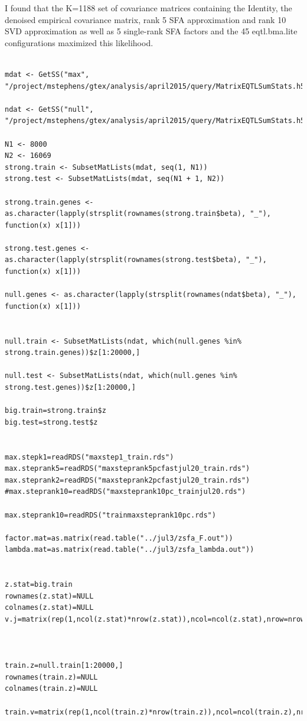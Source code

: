 \documentclass[10pt]{article}
\begin{document}
\begin{itemize}
I found that the K=1188 set of covariance matrices containing the Identity, the denoised empirical covariance matrix, rank 5 SFA approximation and rank 10 SVD approximation as well as 5 single-rank SFA factors and the 45 eqtl.bma.lite configurations maximized this likelihood.


\begin{verbatim}

mdat <- GetSS("max", "/project/mstephens/gtex/analysis/april2015/query/MatrixEQTLSumStats.h5")

ndat <- GetSS("null", "/project/mstephens/gtex/analysis/april2015/query/MatrixEQTLSumStats.h5")

N1 <- 8000
N2 <- 16069
strong.train <- SubsetMatLists(mdat, seq(1, N1))
strong.test <- SubsetMatLists(mdat, seq(N1 + 1, N2))

strong.train.genes <- as.character(lapply(strsplit(rownames(strong.train$beta), "_"), function(x) x[1])) 

strong.test.genes <- as.character(lapply(strsplit(rownames(strong.test$beta), "_"), function(x) x[1]))

null.genes <- as.character(lapply(strsplit(rownames(ndat$beta), "_"), function(x) x[1]))


null.train <- SubsetMatLists(ndat, which(null.genes %in% strong.train.genes))$z[1:20000,]

null.test <- SubsetMatLists(ndat, which(null.genes %in% strong.test.genes))$z[1:20000,]

big.train=strong.train$z
big.test=strong.test$z


max.stepk1=readRDS("maxstep1_train.rds")
max.steprank5=readRDS("maxsteprank5pcfastjul20_train.rds")
max.steprank2=readRDS("maxsteprank2pcfastjul20_train.rds")
#max.steprank10=readRDS("maxsteprank10pc_trainjul20.rds")

max.steprank10=readRDS("trainmaxsteprank10pc.rds")

factor.mat=as.matrix(read.table("../jul3/zsfa_F.out"))
lambda.mat=as.matrix(read.table("../jul3/zsfa_lambda.out"))


z.stat=big.train
rownames(z.stat)=NULL
colnames(z.stat)=NULL
v.j=matrix(rep(1,ncol(z.stat)*nrow(z.stat)),ncol=ncol(z.stat),nrow=nrow(z.stat))



train.z=null.train[1:20000,]
rownames(train.z)=NULL
colnames(train.z)=NULL

train.v=matrix(rep(1,ncol(train.z)*nrow(train.z)),ncol=ncol(train.z),nrow=nrow(train.z))


\end{verbatim}
\end{itemize}
\end{document}
